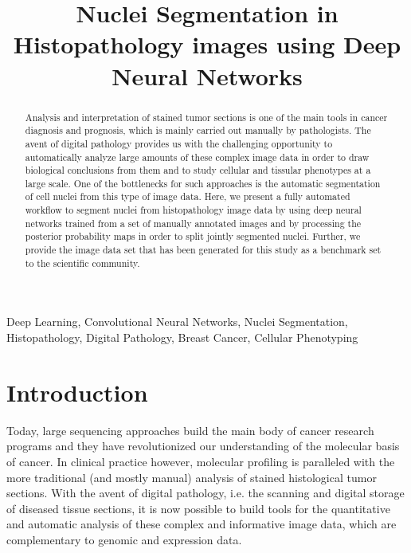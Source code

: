 \documentclass{article}
\title{Nuclei Segmentation in Histopathology
  images using Deep Neural Networks}
\begin{document}
%
\maketitle
\vspace{-1cm}
%
\begin{abstract}
Analysis and interpretation of stained tumor sections is one of the
main tools in cancer diagnosis and prognosis, which is mainly carried
out manually by pathologists. The avent of digital pathology provides
us with the challenging opportunity to automatically analyze large
amounts of these complex image data in order to draw
biological conclusions from them and to study cellular and tissular
phenotypes at a large scale. One of the bottlenecks for such
approaches is the automatic segmentation of cell nuclei from this type
of image data. Here, we present a fully automated workflow to segment
nuclei from histopathology image data by using deep neural
networks trained from a set of manually annotated images and by processing
the posterior probability maps in order to split jointly segmented
nuclei. Further, we provide the image data set that has been generated
for this study as a benchmark set to the scientific community.  
\end{abstract}
%
\begin{keywords}
Deep Learning, Convolutional Neural Networks, Nuclei Segmentation,
Histopathology, Digital Pathology, Breast Cancer, Cellular Phenotyping
\end{keywords}
%
\section{Introduction}
\label{sec:intro}

\noindent Today, large sequencing approaches build the main body of cancer
research programs and they have revolutionized our understanding of
the molecular basis of cancer. In clinical practice however,
molecular profiling is paralleled with the more traditional
(and mostly manual) analysis of stained histological tumor
sections. With the avent of digital pathology, i.e. the scanning and
digital storage of diseased tissue sections, it is now possible to
build tools for the quantitative and automatic analysis of these
complex and informative image data, which are complementary to genomic
and expression data.

\end{document}
